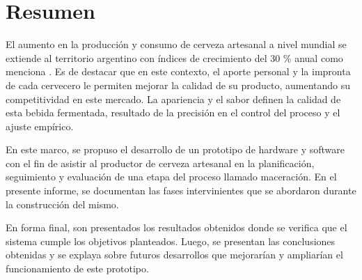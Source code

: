 \pagestyle{plain}
\afterpage{\null\newpage}\thispagestyle{plain}
\newpage
\chapter{Resumen}
\par
    El aumento en la producción y consumo de cerveza artesanal a nivel mundial se extiende al territorio argentino con índices de crecimiento del 30 \% anual como menciona \cite{Cuculiansky17}. Es de destacar que en este contexto, el aporte personal y la impronta de cada cervecero le permiten mejorar la calidad de su producto, aumentando su competitividad en este mercado. La apariencia y el sabor definen la calidad de esta bebida fermentada, resultado de la precisión en el control del proceso y el ajuste empírico.
\par
    En este marco, se propuso el desarrollo de un prototipo de hardware y software con el fin de asistir al productor de cerveza artesanal en la planificación, seguimiento y evaluación de una etapa del proceso llamado maceración. En el presente informe, se documentan las fases intervinientes que se abordaron durante la construcción del mismo.
\par
    En forma final, son presentados los resultados obtenidos donde se verifica que el sistema cumple los objetivos planteados. Luego, se presentan las conclusiones obtenidas y se explaya sobre futuros desarrollos que mejorarían y ampliarían el funcionamiento de este prototipo.